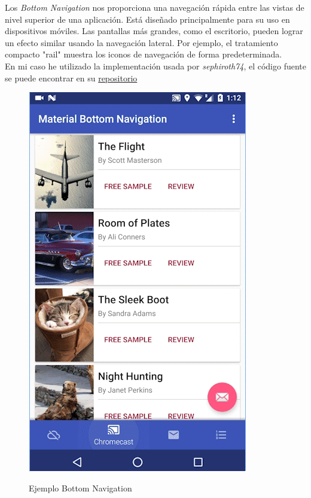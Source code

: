 Los \textit{Bottom Navigation} nos proporciona una navegación rápida entre las vistas de nivel superior de una aplicación. Está diseñado principalmente para su uso en dispositivos móviles. Las pantallas más grandes, como el escritorio, pueden lograr un efecto similar usando la navegación lateral. Por ejemplo, el tratamiento compacto "rail" muestra los iconos de navegación de forma predeterminada.\\

En mi caso he utilizado la implementación usada por \textit{sephiroth74}, el código fuente se puede encontrar en su \href{https://github.com/sephiroth74/Material-BottomNavigation}{repositorio}\\

\begin{figure}[H] %
\centering
\includegraphics[scale=0.5]{imagenes/mbottom.png}  %
\label{mbottom}
\caption{Ejemplo Bottom Navigation}
\end{figure}

